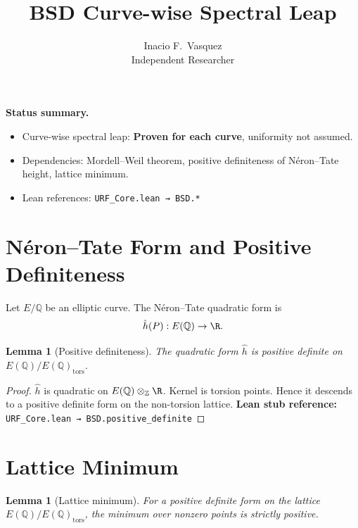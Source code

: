 \documentclass[11pt]{article}
\title{\textbf{BSD Curve-wise Spectral Leap}}
\author{Inacio F.\ Vasquez \\ Independent Researcher}
\date{}
\theoremstyle{plain}
\newtheorem{lemma}[theorem]{Lemma}
\theoremstyle{remark}
\newcommand{\Q}{\mathbb{Q}}
\newcommand{\Z}{\mathbb{Z}}
\newcommand{\hath}{\hat h}
\begin{document}
\maketitle

\begin{center}
\textbf{Status summary.}
\begin{itemize}
\item Curve-wise spectral leap: \textbf{Proven for each curve}, uniformity not assumed.
\item Dependencies: Mordell--Weil theorem, positive definiteness of Néron--Tate height, lattice minimum.
\item Lean references: \texttt{URF\_Core.lean → BSD.*}
\end{itemize}
\end{center}

\tableofcontents

\section{Néron--Tate Form and Positive Definiteness}

\begin{definition}
Let $E/\Q$ be an elliptic curve. The Néron--Tate quadratic form is
\[
\hath(P) : E(\Q) \to \R.
\]
\end{definition}

\begin{lemma}[Positive definiteness]\label{lem:bsd-positive}
The quadratic form $\hath$ is positive definite on $E(\Q)/E(\Q)_{\mathrm{tors}}$.
\end{lemma}

\begin{proof}
$\hath$ is quadratic on $E(\Q)\otimes_\Z \R$.  
Kernel is torsion points.  
Hence it descends to a positive definite form on the non-torsion lattice.  
\textbf{Lean stub reference:} \texttt{URF\_Core.lean → BSD.positive\_definite}
\end{proof}

\section{Lattice Minimum}

\begin{lemma}[Lattice minimum]\label{lem:bsd-lattice}
For a positive definite form on the lattice $E(\Q)/E(\Q)_{\mathrm{tors}}$, the minimum over nonzero points is strictly positive.
\end{lemma}
\end{document}
